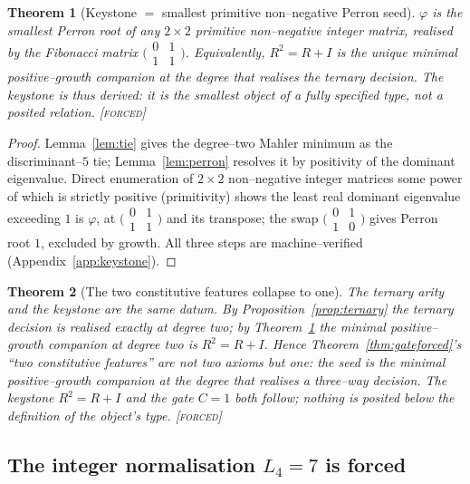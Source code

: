 \documentclass[11pt]{article}
\theoremstyle{plain}
\newtheorem{theorem}{Theorem}[section]
\theoremstyle{definition}
\theoremstyle{remark}
\newcommand{\forced}{\textcolor{forcedc}{\textsc{[forced]}}}
\begin{document}
\begin{theorem}[Keystone $=$ smallest primitive non--negative Perron seed]\label{thm:keystonederived}
$\varphi$ is the smallest Perron root of any $2\times2$ primitive non--negative integer matrix, realised by the Fibonacci matrix $\bigl(\begin{smallmatrix}0&1\\1&1\end{smallmatrix}\bigr)$. Equivalently, $R^2=R+I$ is the unique minimal positive--growth companion at the degree that realises the ternary decision. The keystone is thus \emph{derived}: it is the smallest object of a fully specified type, not a posited relation. \forced
\end{theorem}

\begin{proof}
Lemma~\ref{lem:tie} gives the degree--two Mahler minimum as the discriminant--$5$ tie; Lemma~\ref{lem:perron} resolves it by positivity of the dominant eigenvalue. Direct enumeration of $2\times2$ non--negative integer matrices some power of which is strictly positive (primitivity) shows the least real dominant eigenvalue exceeding $1$ is $\varphi$, at $\bigl(\begin{smallmatrix}0&1\\1&1\end{smallmatrix}\bigr)$ and its transpose; the swap $\bigl(\begin{smallmatrix}0&1\\1&0\end{smallmatrix}\bigr)$ gives Perron root $1$, excluded by growth. All three steps are machine--verified (Appendix~\ref{app:keystone}). \end{proof}

\begin{theorem}[The two constitutive features collapse to one]\label{thm:collapse}
The ternary arity and the keystone are the same datum. By Proposition~\ref{prop:ternary} the ternary decision is realised exactly at degree two; by Theorem~\ref{thm:keystonederived} the minimal positive--growth companion at degree two is $R^2=R+I$. Hence Theorem~\ref{thm:gateforced}'s ``two constitutive features'' are not two axioms but one: \emph{the seed is the minimal positive--growth companion at the degree that realises a three--way decision.} The keystone $R^2=R+I$ and the gate $C=1$ both follow; nothing is posited below the definition of the object's type. \forced
\end{theorem}

\subsection{The integer normalisation \texorpdfstring{$L_4=7$}{L4 = 7} is forced}
\end{document}
